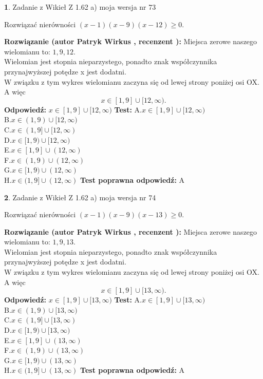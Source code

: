 \documentclass[12pt, a4paper]{article}
\theoremstyle{definition} %
\newtheorem{zad}{}
\newcommand{\zadStart}[1]{\begin{zad}#1\newline}
\newcommand{\zadStop}{\end{zad}}
\newcommand{\rozwStart}[2]{\noindent \textbf{Rozwiązanie (autor #1 , recenzent #2): }\newline}
\newcommand{\rozwStop}{\newline}
\newcommand{\odpStart}{\noindent \textbf{Odpowiedź:}\newline}
\newcommand{\odpStop}{\newline}
\newcommand{\testStart}{\noindent \textbf{Test:}\newline}
\newcommand{\testStop}{\newline}
\newcommand{\kluczStart}{\noindent \textbf{Test poprawna odpowiedź:}\newline}
\newcommand{\kluczStop}{\newline}
\begin{document}
\zadStart{Zadanie z Wikieł Z 1.62 a) moja wersja nr 73}

Rozwiązać nierówności $(x-1)(x-9)(x-12)\ge0$.
\zadStop
\rozwStart{Patryk Wirkus}{}
Miejsca zerowe naszego wielomianu to: $1, 9, 12$.\\
Wielomian jest stopnia nieparzystego, ponadto znak współczynnika przy\linebreak najwyższej potędze x jest dodatni.\\ W związku z tym wykres wielomianu zaczyna się od lewej strony poniżej osi OX. A więc $$x \in [1,9] \cup [12,\infty).$$
\rozwStop
\odpStart
$x \in [1,9] \cup [12,\infty)$
\odpStop
\testStart
A.$x \in [1,9] \cup [12,\infty)$\\
B.$x \in (1,9) \cup [12,\infty)$\\
C.$x \in (1,9] \cup [12,\infty)$\\
D.$x \in [1,9) \cup [12,\infty)$\\
E.$x \in [1,9] \cup (12,\infty)$\\
F.$x \in (1,9) \cup (12,\infty)$\\
G.$x \in [1,9) \cup (12,\infty)$\\
H.$x \in (1,9] \cup (12,\infty)$
\testStop
\kluczStart
A
\kluczStop



\zadStart{Zadanie z Wikieł Z 1.62 a) moja wersja nr 74}

Rozwiązać nierówności $(x-1)(x-9)(x-13)\ge0$.
\zadStop
\rozwStart{Patryk Wirkus}{}
Miejsca zerowe naszego wielomianu to: $1, 9, 13$.\\
Wielomian jest stopnia nieparzystego, ponadto znak współczynnika przy\linebreak najwyższej potędze x jest dodatni.\\ W związku z tym wykres wielomianu zaczyna się od lewej strony poniżej osi OX. A więc $$x \in [1,9] \cup [13,\infty).$$
\rozwStop
\odpStart
$x \in [1,9] \cup [13,\infty)$
\odpStop
\testStart
A.$x \in [1,9] \cup [13,\infty)$\\
B.$x \in (1,9) \cup [13,\infty)$\\
C.$x \in (1,9] \cup [13,\infty)$\\
D.$x \in [1,9) \cup [13,\infty)$\\
E.$x \in [1,9] \cup (13,\infty)$\\
F.$x \in (1,9) \cup (13,\infty)$\\
G.$x \in [1,9) \cup (13,\infty)$\\
H.$x \in (1,9] \cup (13,\infty)$
\testStop
\kluczStart
A
\kluczStop
\end{document}
